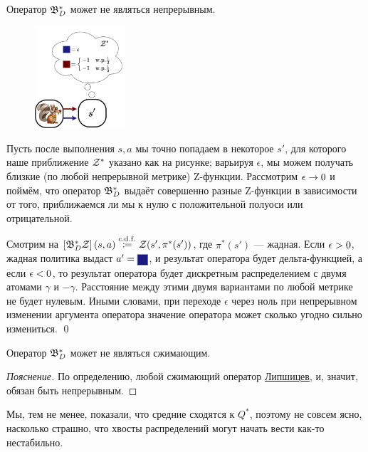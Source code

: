 \begin{theorem}
Оператор $\mathfrak{B}^*_D$ может не являться непрерывным.

\begin{figure}
\vspace{-0.7cm}
\centering
\includegraphics[width=0.3\textwidth]{Images/distributionalVIissue.png}
\vspace{0.2cm}
\end{figure}
\beginproof
Пусть после выполнения $s, a$ мы точно попадаем в некоторое $s'$, для которого наше приближение $\mathcal{Z}^*$ указано как на рисунке; варьируя $\epsilon$, мы можем получать близкие (по любой непрерывной метрике) Z-функции. Рассмотрим $\epsilon \HM\to 0$ и поймём, что оператор $\mathfrak{B}^*_D$ выдаёт совершенно разные Z-функции в зависимости от того, приближаемся ли мы к нулю с положительной полуоси или отрицательной.

Смотрим на $\left[ \B^*_D \Z \right](s, a) \HM\cdfcoloneqq \Z(s', \pi^*(s'))$, где $\pi^*(s')$ --- жадная. Если $\epsilon \HM> 0$, жадная политика выдаст $a' \HM= \text{\colorsquare{ChadBlue}}$, и результат оператора будет дельта-функцией, а если $\epsilon \HM< 0$, то результат оператора будет дискретным распределением с двумя атомами $\gamma$ и $-\gamma$. Расстояние между этими двумя вариантами по любой метрике не будет нулевым. Иными словами, при переходе $\epsilon$ через ноль при непрерывном изменении аргумента оператора значение оператора может сколько угодно сильно измениться. \qed
\end{theorem}

\begin{proposition}
Оператор $\mathfrak{B}^*_D$ может не являться сжимающим.
\begin{proof}[Пояснение] По определению, любой сжимающий оператор \href{https://ru.wikipedia.org/wiki/Липшицево_отображение}{Липшицев}, и, значит, обязан быть непрерывным.
\end{proof}
\end{proposition}

Мы, тем не менее, показали, что средние сходятся к $Q^*$, поэтому не совсем ясно, насколько страшно, что хвосты распределений могут начать вести как-то нестабильно.


